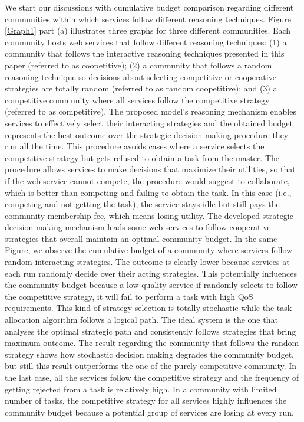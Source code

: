 \documentclass[fleqn]{singlecol-new}
\begin{document}
We start our discussions with cumulative budget comparison
regarding different communities within which services follow
different reasoning techniques. Figure \ref{Graph1} part (a)
illustrates three graphs for three different communities. Each
community hosts web services that follow different reasoning
techniques: (1) a community that follows the interactive reasoning
techniques presented in this paper (referred to as coopetitive);
(2) a community that follows a random reasoning technique so
decisions about selecting competitive or cooperative strategies
are totally random (referred to as random coopetitive); and (3) a
competitive community where all services follow the competitive
strategy (referred to as competitive). The proposed model's
reasoning mechanism enables services to effectively select their
interacting strategies and the obtained budget represents the best
outcome over the strategic decision making procedure they run all
the time. This procedure avoids cases where a service selects the
competitive strategy but gets refused to obtain a task from the
master. The procedure allows services to make decisions that
maximize their utilities, so that if the web service cannot
compete, the procedure would suggest to collaborate, which is
better than competing and failing to obtain the task. In this case
(i.e., competing and not getting the task), the service stays idle
but still pays the community membership fee, which means losing
utility. The developed strategic decision making mechanism leads
some web services to follow cooperative strategies that overall
maintain an optimal community budget. In the same Figure, we
observe the cumulative budget of a community where services follow
random interacting strategies. The outcome is clearly lower
because services at each run randomly decide over their acting
strategies. This potentially influences the community budget
because a low quality service if randomly selects to follow the
competitive strategy, it will fail to perform a task with high QoS requirements. This kind of
strategy selection is totally stochastic while the task allocation
algorithm follows a logical path. The ideal system is the one that
analyses the optimal strategic path and consistently follows
strategies that bring maximum outcome. The result regarding the
community that follows the random strategy shows how stochastic
decision making degrades the community budget, but still this
result outperforms the one of the purely competitive community. In
the last case, all the services follow the competitive strategy
and the frequency of getting rejected from a task is relatively
high. In a community with limited number of tasks, the competitive
strategy for all services highly influences the community budget
because a potential group of services are losing at every run.
\end{document}
